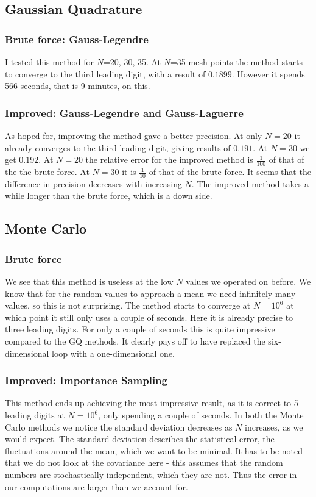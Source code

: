 \documentclass[norsk,a4paper,11pt]{article}
\begin{document}
\subsection{Gaussian Quadrature}
\subsubsection{Brute force: Gauss-Legendre}
I tested this method for $N$=20, 30, 35. At $N$=35 mesh points 
the method starts to converge to the third leading digit, with a result of $0.1899$. However it spends 566 seconds, that is 9 minutes,
on this.

\subsubsection{Improved: Gauss-Legendre and Gauss-Laguerre}
As hoped for, improving the method gave a better precision. At only $N=20$ it already converges to the third leading digit, giving results
of $0.191$. At $N=30$ we get $0.192$. At $N=20$ the relative error for the improved method is $\frac{1}{100}$ of that of the
the brute force. At $N=30$ it is $\frac{1}{10}$ of that of the brute force. It seems that the difference in precision decreases with
increasing $N$. The improved method takes a while longer than the brute force, which is a down side. 

\subsection{Monte Carlo}
\subsubsection{Brute force}
We see that this method is useless at the low $N$ values we operated on before. We know that for the random values to approach a mean
we need infinitely many values, so this is not surprising. The method starts to converge at $N=10^6$ at which point it still only uses
a couple of seconds. Here it is already precise to three leading digits. For only a couple of seconds this is quite impressive
compared to the GQ methods. It clearly pays off to have replaced the six-dimensional loop with a one-dimensional one.

\subsubsection{Improved: Importance Sampling}
This method ends up achieving the most impressive result, as it is correct to 5 leading digits at $N=10^6$, only spending a couple
of seconds. 
In both the Monte Carlo methods we notice the standard deviation decreases as $N$ increases, as we would expect.
The standard deviation describes the statistical error, the fluctuations around the mean, which we want to be minimal.
It has to be noted that we do not look at the covariance here - this assumes that the random numbers are stochastically independent,
which they are not. Thus the error in our computations are larger than we account for.
\end{document}
